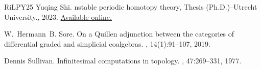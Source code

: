 \documentclass[a4paper,12pt]{amsart}
\theoremstyle{plain}
\theoremstyle{definition}
\theoremstyle{remark}
\begin{document}
\begin{thebibliography}{RiLPY25}
Yuqing Shi.
nstable {p}eriodic {h}omotopy {t}heory, {T}hesis
  ({P}h.{D}.)--{U}trecht {U}niversity., 2023.
\newblock
  \href{https://dspace.library.uu.nl/bitstream/handle/1874/431446/shi%20-%20thesisonlineubu%20-%20650bf9a776efd.pdf?sequence=1&isAllowed=y}{Available
  online.}

W.~Hermann~B. Sore.
\newblock On a {Q}uillen adjunction between the categories of differential
  graded and simplicial coalgebras.
, 14(1):91--107, 2019.

Dennis Sullivan.
\newblock Infinitesimal computations in topology.
, 47:269--331, 1977.
\end{thebibliography}

\end{document}
